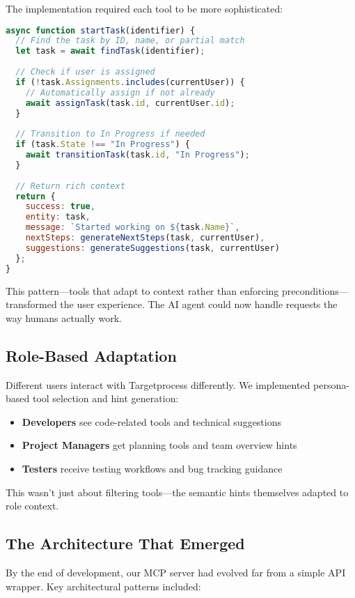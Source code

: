 \documentclass[11pt,a4paper]{article}
\begin{document}
The implementation required each tool to be more sophisticated:

\begin{lstlisting}[language=JavaScript]
async function startTask(identifier) {
  // Find the task by ID, name, or partial match
  let task = await findTask(identifier);
  
  // Check if user is assigned
  if (!task.Assignments.includes(currentUser)) {
    // Automatically assign if not already
    await assignTask(task.id, currentUser.id);
  }
  
  // Transition to In Progress if needed
  if (task.State !== "In Progress") {
    await transitionTask(task.id, "In Progress");
  }
  
  // Return rich context
  return {
    success: true,
    entity: task,
    message: `Started working on ${task.Name}`,
    nextSteps: generateNextSteps(task, currentUser),
    suggestions: generateSuggestions(task, currentUser)
  };
}
\end{lstlisting}

This pattern—tools that adapt to context rather than enforcing preconditions—transformed the user experience. The AI agent could now handle requests the way humans actually work.

\subsection{Role-Based Adaptation}

Different users interact with Targetprocess differently. We implemented persona-based tool selection and hint generation:

\begin{itemize}
\item \textbf{Developers} see code-related tools and technical suggestions
\item \textbf{Project Managers} get planning tools and team overview hints  
\item \textbf{Testers} receive testing workflows and bug tracking guidance
\end{itemize}

This wasn't just about filtering tools—the semantic hints themselves adapted to role context.

\subsection{The Architecture That Emerged}

By the end of development, our MCP server had evolved far from a simple API wrapper. Key architectural patterns included:
\end{document}
